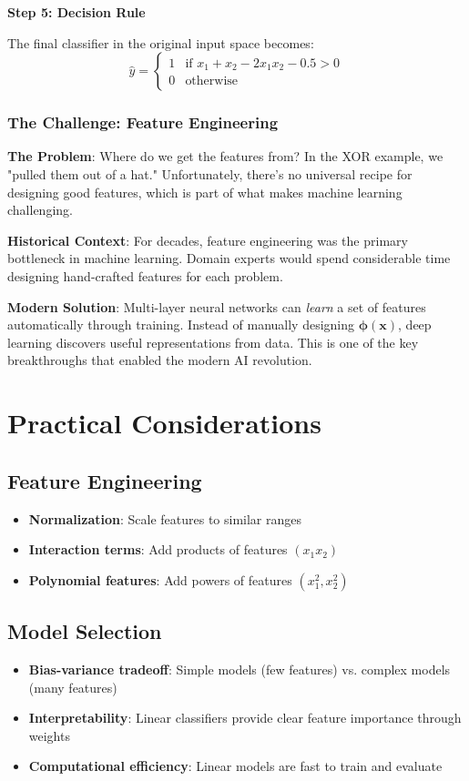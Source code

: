 \textbf{Step 5: Decision Rule}

The final classifier in the original input space becomes:
\begin{equation}
\hat{y} = \begin{cases}
1 & \text{if } x_1 + x_2 - 2x_1x_2 - 0.5 > 0 \\
0 & \text{otherwise}
\end{cases}
\end{equation}

\subsubsection{The Challenge: Feature Engineering}

\textbf{The Problem}: Where do we get the features from? In the XOR example, we "pulled them out of a hat." Unfortunately, there's no universal recipe for designing good features, which is part of what makes machine learning challenging.

\textbf{Historical Context}: For decades, feature engineering was the primary bottleneck in machine learning. Domain experts would spend considerable time designing hand-crafted features for each problem.

\textbf{Modern Solution}: Multi-layer neural networks can \textit{learn} a set of features automatically through training. Instead of manually designing $\bm{\phi}(\mathbf{x})$, deep learning discovers useful representations from data. This is one of the key breakthroughs that enabled the modern AI revolution.

\section{Practical Considerations}

\subsection{Feature Engineering}
\begin{itemize}
    \item \textbf{Normalization}: Scale features to similar ranges
    \item \textbf{Interaction terms}: Add products of features $(x_1 x_2)$
    \item \textbf{Polynomial features}: Add powers of features $(x_1^2, x_2^2)$
\end{itemize}

\subsection{Model Selection}
\begin{itemize}
    \item \textbf{Bias-variance tradeoff}: Simple models (few features) vs. complex models (many features)
    \item \textbf{Interpretability}: Linear classifiers provide clear feature importance through weights
    \item \textbf{Computational efficiency}: Linear models are fast to train and evaluate
\end{itemize}


